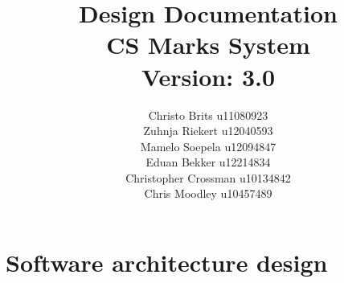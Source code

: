 \documentclass[12pt,a4paper]{article}
\begin{document}
\begin{titlepage}
\title{Design Documentation\\CS Marks System\\ \small Version: 3.0}
\author{Christo Brits u11080923\\
Zuhnja Riekert u12040593\\
Mamelo Soepela u12094847\\
Eduan Bekker u12214834\\
Christopher Crossman u10134842\\
Chris Moodley u10457489}
\maketitle
\end{titlepage}
\tableofcontents
\pagebreak
\section{Software architecture design}
\end{document}

